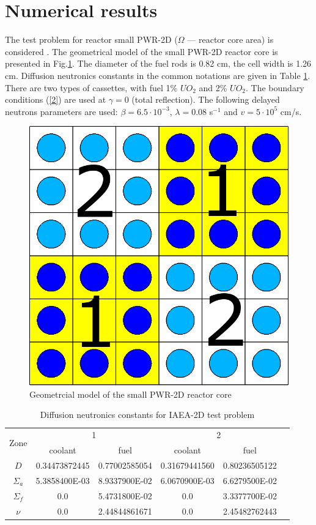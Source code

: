 \documentclass[runningheads]{llncs}
\begin{document}
\section{Numerical results}
The test problem for reactor small PWR-2D ($\Omega$ --- reactor core area) is considered \cite{Chao}. 
The geometrical model of the small PWR-2D reactor core is presented in Fig.\ref{p3}. 
The diameter of the fuel rods is 0.82 cm, the cell width is 1.26 cm.
Diffusion neutronics constants in the common notations are given in Table \ref{t1}. 
There are two types of cassettes, with fuel 1\% $UO_2$ and 2\% $UO_2$.
The boundary conditions (\ref{2}) are used at $\gamma = 0$ (total reflection).
The following delayed neutrons parameters are used: $\beta = 6.5 \cdot 10^{−3}$, $\lambda = 0.08$ s$^{-1}$ and $v = 5 \cdot 10^5$ cm/s.

\begin{figure}[h]
  \begin{center}
    \includegraphics[width=0.35\linewidth] {smallpwr.png}
	\caption{Geometrcial model of the small PWR-2D reactor core}
	\label{p3}
  \end{center}
\end{figure} 

\begin{table}[h]
\caption{Diffusion neutronics constants for IAEA-2D test problem}
\label{t1}
\begin{center}
\begin{tabular}{|c|c|c|c|c|c|}
\hline
\multirow{2}{*}{Zone} & \multicolumn{2}{c|}{1} & \multicolumn{2}{c|}{2} \\
\cline{2-5}
& coolant & fuel & coolant & fuel \\
\hline
$D$ & 0.34473872445 & 0.77002585054 & 0.31679441560 & 0.80236505122 \\
$\Sigma_a$ & 5.3858400E-03 & 8.9337900E-02 & 6.0670900E-03 & 6.6279500E-02 \\
$\Sigma_{f}$ & 0.0 & 5.4731800E-02 & 0.0 & 3.3377700E-02 \\
$\nu$ & 0.0 & 2.44844861671 & 0.0 & 2.45482762443 \\
\hline
\end{tabular}
\end{center}
\end{table}
\end{document}
